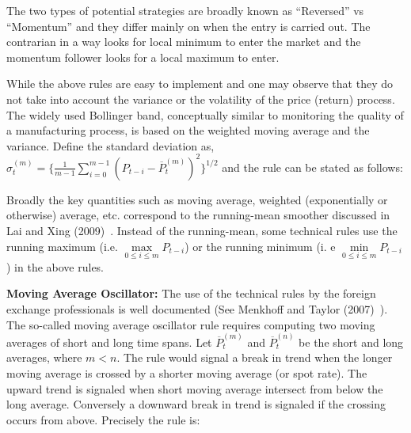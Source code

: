 The two types of potential strategies are broadly known as ``Reversed'' vs ``Momentum'' and they differ mainly on when the entry is carried out. The contrarian in a way looks for local minimum to enter the market and the momentum follower looks for a local maximum to enter.


While the above rules are easy to implement and one may observe that they do not take into account the variance or the volatility of the price (return) process. The widely used Bollinger band, conceptually similar to monitoring the quality of a manufacturing process, is based on the weighted moving average and the variance. Define the standard deviation as, $\hat{\sigma}_{t}^{(m)} = \{ \frac{1}{m-1} \sum_{i=0}^{m-1} (P_{t-i} - \overline{P}_{t}^{(m)})^2 \}^{1/2}$ and the rule can be stated as follows: \twomedskip


\noindent{} \twomedskip


Broadly the key quantities such as moving average, weighted (exponentially or otherwise) average, etc. correspond to the running-mean smoother discussed in Lai and Xing (2009)~\cite[Section 7.2.1]{lai1}. Instead of the running-mean, some technical rules use the running maximum (i.e. $\max\limits_{0 \leq i \leq m} P_{t-i}$) or the running minimum (i. e $\min\limits_{0 \leq i \leq m} P_{t-i}$) in the above rules. \twomedskip


\noindent\textbf{Moving Average Oscillator:} The use of the technical rules by the foreign exchange professionals is well documented (See Menkhoff and Taylor (2007)~\cite{MalTay}). The so-called moving average oscillator rule requires computing two moving averages of short and long time spans. Let $\overline{P}_{t}^{(m)}$ and $\overline{P}_{t}^{(n)}$ be the short and long averages, where $m< n$. The rule would signal a break in trend when the longer moving average is crossed by a shorter moving average (or spot rate). The upward trend is signaled when short moving average intersect from below the long average. Conversely a downward break in trend is signaled if the crossing occurs from above. Precisely the rule is: \twomedskip


\noindent{} \twomedskip


